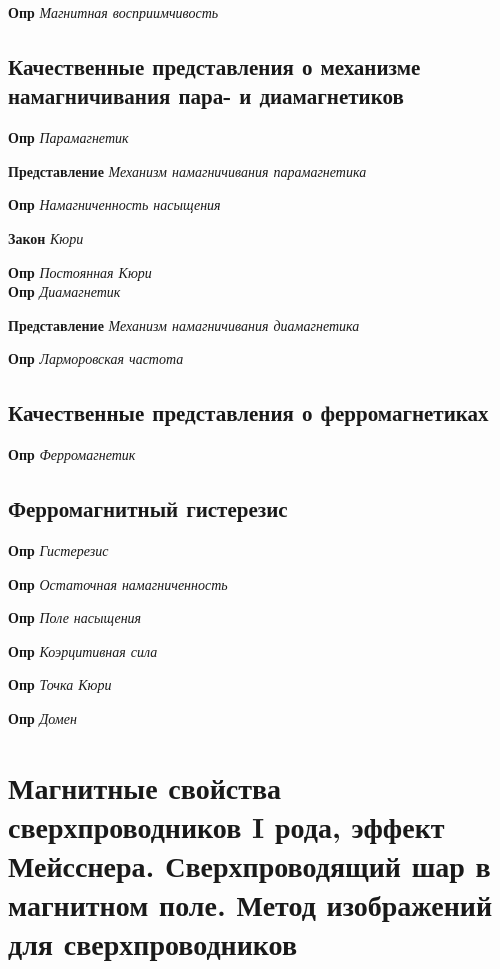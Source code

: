 \documentclass[a4paper, 14pt]{article}
\begin{document}
    \textbf{Опр} \textit{Магнитная восприимчивость}
    
    \subsection{Качественные представления о механизме намагничивания пара- и диамагнетиков}
    
    \textbf{Опр} \textit{Парамагнетик}
    
    \textbf{Представление} \textit{Механизм намагничивания парамагнетика}
    
    \textbf{Опр} \textit{Намагниченность насыщения}
    
    \textbf{Закон} \textit{Кюри}
    
    \textbf{Опр} \textit{Постоянная Кюри} \\
    
    \textbf{Опр} \textit{Диамагнетик}
    
    \textbf{Представление} \textit{Механизм намагничивания диамагнетика}
    
    \textbf{Опр} \textit{Ларморовская частота}
    
    \subsection{Качественные представления о ферромагнетиках}
    
    \textbf{Опр} \textit{Ферромагнетик}
    
    \subsection{Ферромагнитный гистерезис}
    
    \textbf{Опр} \textit{Гистерезис}
    
    \textbf{Опр} \textit{Остаточная намагниченность}
    
    \textbf{Опр} \textit{Поле насыщения}
    
    \textbf{Опр} \textit{Коэрцитивная сила}
    
    \textbf{Опр} \textit{Точка Кюри}
    
    \textbf{Опр} \textit{Домен}
    
    \section{Магнитные свойства сверхпроводников I рода, эффект Мейсснера.
    Сверхпроводящий шар в магнитном поле.
    Метод изображений для сверхпроводников}
    
\end{document}
